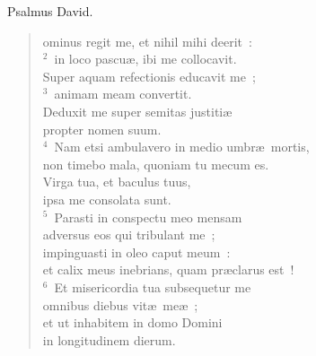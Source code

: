 \bchapter[Psalm]
Psalmus David. \begin{verse}ominus regit me, et nihil mihi deerit~:\\
${}^{2}$~in loco pascu\ae , ibi me collocavit.\\ Super aquam refectionis educavit me~;\\
${}^{3}$~animam meam convertit.\\ Deduxit me super semitas justiti\ae \\ propter nomen suum.\\
${}^{4}$~Nam etsi ambulavero in medio umbr\ae\ mortis,\\ non timebo mala, quoniam tu mecum es.\\ Virga tua, et baculus tuus,\\ ipsa me consolata sunt.\\
${}^{5}$~Parasti in conspectu meo mensam\\ adversus eos qui tribulant me~;\\ impinguasti in oleo caput meum~:\\ et calix meus inebrians, quam pr\ae clarus est~!\\
${}^{6}$~Et misericordia tua subsequetur me\\ omnibus diebus vit\ae\ me\ae~;\\ et ut inhabitem in domo Domini\\ in longitudinem dierum.\end{verse}




